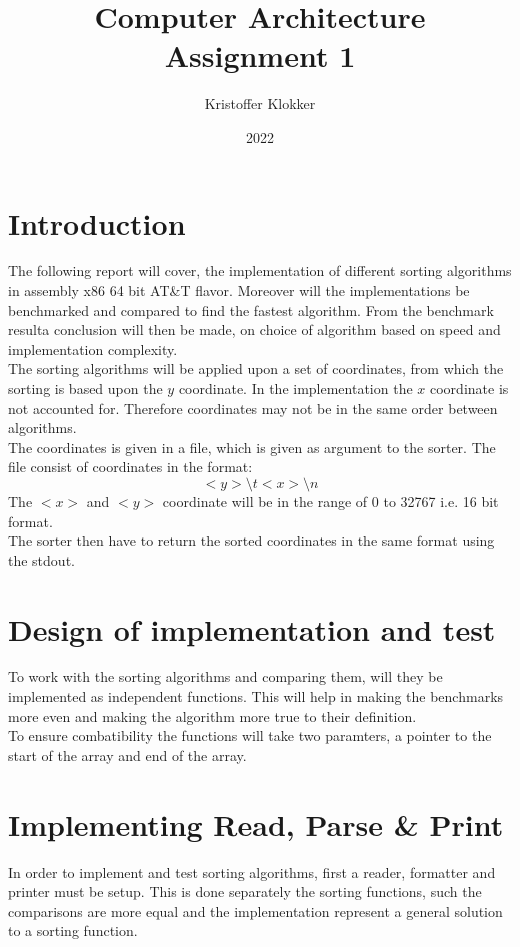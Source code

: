 \documentclass[12pt, a4paper]{article}
\title{Computer Architecture\\Assignment 1}
\date{2022}
\author{Kristoffer Klokker}
\begin{document}
	\maketitle
	\clearpage
	\tableofcontents
	\clearpage
	\section{Introduction}
	The following report will cover, the implementation of different sorting algorithms in assembly x86 64 bit AT\&T flavor. Moreover will the implementations be benchmarked and compared to find the fastest algorithm. From the benchmark resulta conclusion will then be made, on choice of algorithm based on speed and implementation complexity.\\
	The sorting algorithms will be applied upon a set of coordinates, from which the sorting is based upon the $y$ coordinate. In the implementation the $x$ coordinate is not accounted for. Therefore coordinates may not be in the same order between algorithms.\\
	The coordinates is given in a file, which is given as argument to the sorter. The file consist of coordinates in the format:
	$$<y>\setminus t<x>\setminus n$$
	The $<x>$ and $<y>$ coordinate will be in the range of 0 to 32767 i.e. 16 bit format.\\
	The sorter then have to return the sorted coordinates in the same format using the stdout.
	\section{Design of implementation and test}
		To work with the sorting algorithms and comparing them, will they be implemented as independent functions. This will help in making the benchmarks more even and making the algorithm more true to their definition.\\
		To ensure combatibility the functions will take two paramters, a pointer to the start of the array and end of the array. 
	\section{Implementing Read, Parse \& Print}
		In order to implement and test sorting algorithms, first a reader, formatter and printer must be setup. This is done separately the sorting functions, such the comparisons are more equal and the implementation represent a general solution to a sorting function.
\end{document}
